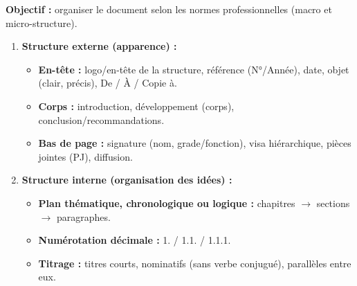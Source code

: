 \documentclass[11pt]{article}
\begin{document}
\begin{methode}
    \textbf{Objectif :} organiser le document selon les normes professionnelles (macro et micro-structure).
    \begin{enumerate}
        \item \textbf{Structure externe (apparence) :}
        \begin{itemize}
            \item \textbf{En-tête :} logo/en-tête de la structure, référence (N°/Année), date, objet (clair, précis), De / À / Copie à.
            \item \textbf{Corps :} introduction, développement (corps), conclusion/recommandations.
            \item \textbf{Bas de page :} signature (nom, grade/fonction), visa hiérarchique, pièces jointes (PJ), diffusion.
        \end{itemize}
        \item \textbf{Structure interne (organisation des idées) :}
        \begin{itemize}
            \item \textbf{Plan thématique, chronologique ou logique :} chapitres $\rightarrow$ sections $\rightarrow$ paragraphes.
            \item \textbf{Numérotation décimale :} 1. / 1.1. / 1.1.1.
            \item \textbf{Titrage :} titres courts, nominatifs (sans verbe conjugué), parallèles entre eux.
        \end{itemize}
    \end{enumerate}
\end{methode}
\end{document}
